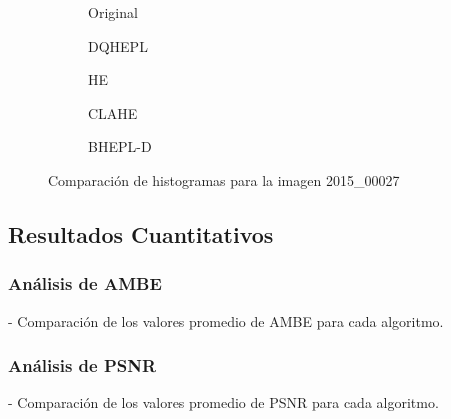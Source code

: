 \documentclass[sigchi]{acmart}
\begin{document}
\begin{figure}[H]
	\centering
	\begin{subfigure}[b]{0.45\textwidth}
		\resizebox{\linewidth}{!}{}
		\caption{Original}
		\label{fig:original_3}
	\end{subfigure}
	\hfill
	\begin{subfigure}[b]{0.45\textwidth}
		\resizebox{\linewidth}{!}{}
		\caption{DQHEPL}
		\label{fig:dqhepl_3}
	\end{subfigure}

	\vspace{5mm}

	\begin{subfigure}[b]{0.45\textwidth}
		\resizebox{\linewidth}{!}{}
		\caption{HE}
		\label{fig:he_3}
	\end{subfigure}
	\hfill
	\begin{subfigure}[b]{0.45\textwidth}
		\resizebox{\linewidth}{!}{}
		\caption{CLAHE}
		\label{fig:clahe_3}
	\end{subfigure}

	\vspace{5mm}

	\centering
	\begin{subfigure}[b]{0.45\textwidth}
		\resizebox{\linewidth}{!}{}
		\caption{BHEPL-D}
		\label{fig:bhepl_3}
	\end{subfigure}

	\caption{Comparación de histogramas para la imagen 2015\_00027}
	\label{fig:histogramas_3}
\end{figure}

\subsection{Resultados Cuantitativos}
\subsubsection{Análisis de AMBE}
- Comparación de los valores promedio de AMBE para cada algoritmo.

\subsubsection{Análisis de PSNR}
- Comparación de los valores promedio de PSNR para cada algoritmo.
\end{document}
